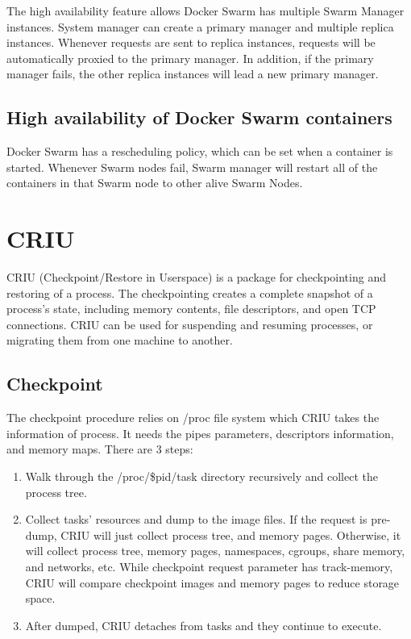The high availability feature allows Docker Swarm has multiple Swarm Manager instances. System manager can create a primary manager and multiple replica instances.
Whenever requests are sent to replica instances, requests will be automatically proxied to the primary manager.
In addition, if the primary manager fails, the other replica instances will lead a new primary manager.

\subsection{High availability of Docker Swarm containers}
Docker Swarm has a rescheduling policy, which can be set when a container is started.  Whenever Swarm nodes fail, Swarm manager will restart all of the containers in that Swarm node to other alive Swarm Nodes.

\section{CRIU}
CRIU \cite{CRIU} (Checkpoint/Restore in Userspace) is a package for checkpointing and restoring of a process.  The checkpointing creates a complete snapshot of a process's state, including  memory contents, file descriptors, and open TCP connections.  CRIU can be used for suspending and resuming processes, or migrating them from one machine to another.

\subsection{Checkpoint}
The checkpoint procedure relies on /proc file system which CRIU takes the information of process.  It needs the pipes parameters, descriptors information, and memory maps. There are 3 steps:
\begin{enumerate}[Step 1.]
	\item Walk through the /proc/\$pid/task directory recursively and collect the process tree.
    \item Collect tasks' resources and dump to the image files.  If the request is pre-dump, CRIU will just collect process tree, and memory pages.  Otherwise, it will collect process tree, memory pages, namespaces, cgroups, share memory, and networks, etc.  While checkpoint request parameter has track-memory, CRIU will compare checkpoint images and memory pages to reduce storage space.
    \item After dumped, CRIU detaches from tasks and they continue to
execute.
\end{enumerate}

